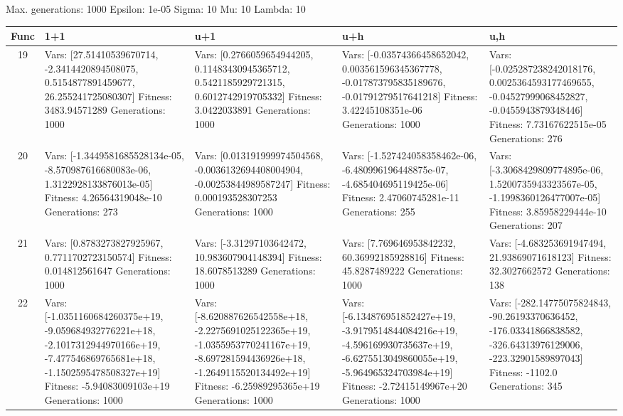 \documentclass[landscape,11pt]{article}
\begin{document}
\newpage
Max. generations: 1000 Epsilon: 1e-05 Sigma: 10 Mu: 10 Lambda: 10 \\
\begin{tabular}{|c|p{5.4cm}|p{5.4cm}|p{5.4cm}|p{5.4cm}|}
\hline
Func & 1+1 & u+1 & u+h & u,h \\ 
\hline 19 & Vars: [27.51410539670714, -2.3414420894508075, 0.5154877891459677, 26.255241725080307] Fitness: 3483.94571289 Generations: 1000 & Vars: [0.2766059654944205, 0.11483430945365712, 0.5421185929721315, 0.6012742919705332] Fitness: 3.0422033891 Generations: 1000 & Vars: [-0.03574366458652042, 0.003561596345367778, -0.017873795835189676, -0.01791279517641218] Fitness: 3.42245108351e-06 Generations: 1000 & Vars: [-0.025287238242018176, 0.0025364593177469655, -0.04527999068452827, -0.0455943879348446] Fitness: 7.73167622515e-05 Generations: 276 \\
 \hline 
 20 & Vars: [-1.3449581685528134e-05, -8.570987616680083e-06, 1.3122928133876013e-05] Fitness: 4.26564319048e-10 Generations: 273 & Vars: [0.013191999974504568, -0.0036132694408004904, -0.00253844989587247] Fitness: 0.000193528307253 Generations: 1000 & Vars: [-1.527424058358462e-06, -6.480996196448875e-07, -4.685404695119425e-06] Fitness: 2.47060745281e-11 Generations: 255 & Vars: [-3.3068429809774895e-06, 1.5200735943323567e-05, -1.1998360126477007e-05] Fitness: 3.85958229444e-10 Generations: 207 \\
 \hline 
 21 & Vars: [0.8783273827925967, 0.7711702723150574] Fitness: 0.014812561647 Generations: 1000 & Vars: [-3.31297103642472, 10.983607904148394] Fitness: 18.6078513289 Generations: 1000 & Vars: [7.769646953842232, 60.36992185928816] Fitness: 45.8287489222 Generations: 1000 & Vars: [-4.683253691947494, 21.93869071618123] Fitness: 32.3027662572 Generations: 138 \\
 \hline 
 22 & Vars: [-1.0351160684260375e+19, -9.059684932776221e+18, -2.1017312944970166e+19, -7.477546869765681e+18, -1.1502595478508327e+19] Fitness: -5.94083009103e+19 Generations: 1000 & Vars: [-8.620887626542558e+18, -2.2275691025122365e+19, -1.0355953770241167e+19, -8.697281594436926e+18, -1.2649115520134492e+19] Fitness: -6.25989295365e+19 Generations: 1000 & Vars: [-6.134876951852427e+19, -3.9179514844084216e+19, -4.596169930735637e+19, -6.6275513049860055e+19, -5.964965324703984e+19] Fitness: -2.72415149967e+20 Generations: 1000 & Vars: [-282.14775075824843, -90.26193370636452, -176.03341866838582, -326.64313976129006, -223.32901589897043] Fitness: -1102.0 Generations: 345 \\
 \hline 
\end{tabular}
\end{document}
